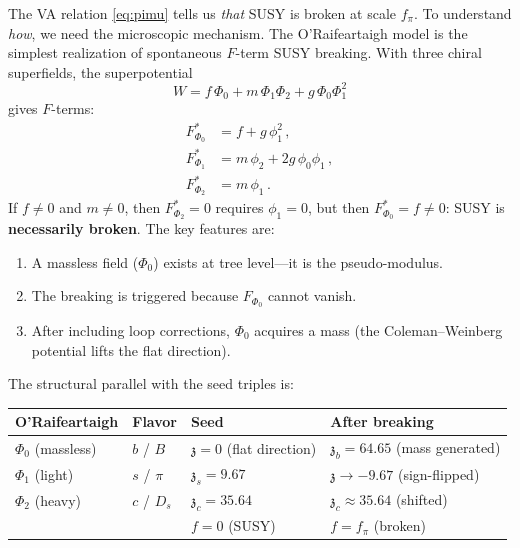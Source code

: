 \documentclass[12pt,a4paper]{article}
\newcommand{\zch}{\mathfrak{z}}
\begin{document}
The VA relation \eqref{eq:pimu} tells us \emph{that} SUSY is broken at 
scale $f_\pi$. To understand \emph{how}, we need the microscopic 
mechanism. The O'Raifeartaigh model \cite{ORaifeartaigh} is the simplest 
realization of spontaneous $F$-term SUSY breaking. With three chiral 
superfields, the superpotential
\begin{equation}
W = f\,\Phi_0 + m\,\Phi_1\Phi_2 + g\,\Phi_0\Phi_1^2
\end{equation}
gives $F$-terms:
\begin{align}
F_{\Phi_0}^* &= f + g\,\phi_1^2\,, \\
F_{\Phi_1}^* &= m\,\phi_2 + 2g\,\phi_0\phi_1\,, \\
F_{\Phi_2}^* &= m\,\phi_1\,.
\end{align}
If $f \neq 0$ and $m \neq 0$, then $F_{\Phi_2}^* = 0$ requires 
$\phi_1 = 0$, but then $F_{\Phi_0}^* = f \neq 0$: SUSY is 
\textbf{necessarily broken}. The key features are:
\begin{enumerate}
\item A massless field ($\Phi_0$) exists at tree level---it is the 
pseudo-modulus.
\item The breaking is triggered because $F_{\Phi_0}$ cannot vanish.
\item After including loop corrections, $\Phi_0$ acquires a mass 
(the Coleman--Weinberg potential lifts the flat direction).
\end{enumerate}

The structural parallel with the seed triples is:

\begin{center}
\begin{tabular}{llll}
\toprule
O'Raifeartaigh & Flavor & Seed & After breaking \\
\midrule
$\Phi_0$ (massless) & $b$ / $B$ & $\zch = 0$ (flat direction) & $\zch_b = 64.65$ (mass generated) \\
$\Phi_1$ (light) & $s$ / $\pi$ & $\zch_s = 9.67$ & $\zch \to -9.67$ (sign-flipped) \\
$\Phi_2$ (heavy) & $c$ / $D_s$ & $\zch_c = 35.64$ & $\zch_c \approx 35.64$ (shifted) \\
\midrule
 & & $f = 0$ (SUSY) & $f = f_\pi$ (broken) \\
\bottomrule
\end{tabular}
\end{center}
\end{document}
